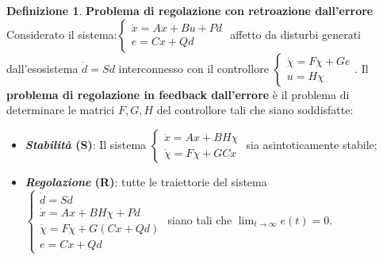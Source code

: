 \documentclass{article}
\theoremstyle{definition}
\newtheorem{definition}{\textbf{Definizione}}
\begin{document}
\begin{definition}{\textbf{Problema di regolazione con retroazione dall'errore}}\\
    Considerato il sistema:\(\begin{cases}
		\dot{x}=Ax+Bu+Pd \\
		e=Cx+Qd
	\end{cases}\) affetto da disturbi generati dall'esosistema \(\dot{d}=Sd\) interconnesso con il controllore \(\begin{cases}
        \dot{\chi}=F\chi + Ge\\
        u=H\chi
    \end{cases}\). Il \textbf{problema di regolazione in feedback dall'errore} è il problema di determinare le matrici \(F,G,H\) del controllore tali che siano soddisfatte:
    \begin{itemize}
        \item \textbf{\emph{Stabilità} (S)}: Il sistema \(\begin{cases}
            \dot{x}=Ax+BH\chi \\
            \dot{\chi}=F\chi+GCx
        \end{cases}\) sia asintoticamente stabile;
        \item \textbf{\emph{Regolazione} (R)}: tutte le traiettorie del sistema \(\begin{cases}
            \dot{d}=Sd\\
            \dot{x}=Ax+BH\chi+Pd \\
            \dot{\chi}=F\chi+G(Cx+Qd)\\
            e=Cx+Qd
        \end{cases}\) siano tali che  \(\lim_{t\rightarrow\infty}e(t)=0\).
    \end{itemize}
\end{definition}
\end{document}
